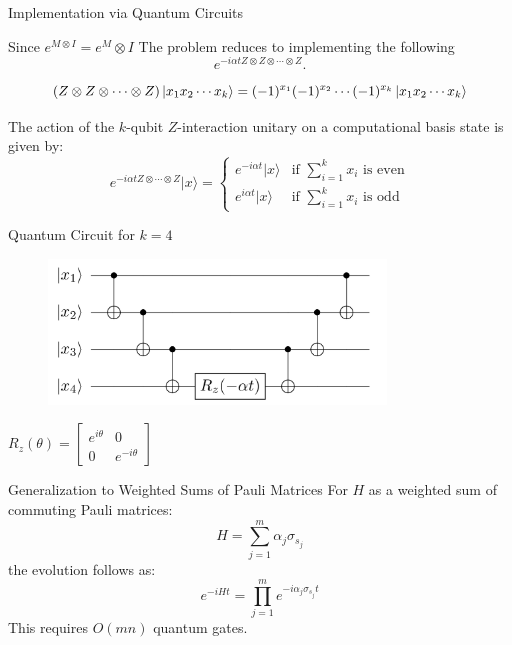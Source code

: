 \documentclass[aspectratio=169,xcolor=dvipsnames]{beamer}
\begin{document}
\begin{frame}{Implementation via Quantum Circuits}
  \begin{block}{Since $e^{M \otimes I} = e^{M} \otimes I$ The problem reduces to implementing the following}
  \begin{equation*}
    e^{-i \alpha t Z \otimes Z \otimes \cdots \otimes Z}.
  \end{equation*}
    \end{block}

  \begin{equation*}
    (Z \otimes Z \otimes \cdots \otimes Z) \ket{x_1 x_2 \cdots x_k} = (-1)^{x_1} (-1)^{x_2} \cdots (-1)^{x_k} \ket{x_1 x_2 \cdots x_k}
  \end{equation*}

  The action of the $k$-qubit $Z$-interaction unitary on a computational basis state is given by:
  \[
    e^{-i\alpha t Z \otimes \cdots \otimes Z} |x\rangle = 
    \begin{cases} 
      e^{-i\alpha t} |x\rangle & \text{if } \sum_{i=1}^k x_i \text{ is even} \\
      e^{i\alpha t} |x\rangle & \text{if } \sum_{i=1}^k x_i \text{ is odd}
    \end{cases}
  \]
\end{frame}

\begin{frame}{Quantum Circuit for $k=4$}
  \begin{center}
    \begin{figure}[htbp]
      \centering
      \includegraphics[width=0.8\textwidth]{rsc/circuit.png}
    \end{figure}

  \end{center}
  $R_z(\theta) = \begin{bmatrix} e^{i \theta} & 0 \\ 0 & e^{-i \theta} \end{bmatrix}$
\end{frame}

\begin{frame}{Generalization to Weighted Sums of Pauli Matrices}
  For $H$ as a weighted sum of commuting Pauli matrices:
  \begin{equation*}
    H = \sum_{j=1}^{m} \alpha_j \sigma_{s_j}
  \end{equation*}
  the evolution follows as:
  \begin{equation*}
    e^{-i H t} = \prod_{j=1}^{m} e^{-i \alpha_j \sigma_{s_j} t}
  \end{equation*}
  This requires $O(mn)$ quantum gates.
\end{frame}
\end{document}
